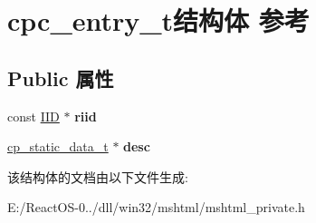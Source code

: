 \hypertarget{structcpc__entry__t}{}\section{cpc\+\_\+entry\+\_\+t结构体 参考}
\label{structcpc__entry__t}
\subsection*{Public 属性}
\begin{DoxyCompactItemize}
\item 
\mbox{\label{structcpc__entry__t_ae70b347a235b8e35c032e3fdef2b6d48}} 
const \hyperlink{struct___i_i_d}{I\+ID} $\ast$ {\bfseries riid}
\item 
\mbox{\label{structcpc__entry__t_a917beb05c50da494cd9ccd8e79f2e345}} 
\hyperlink{struct__cp__static__data__t}{cp\+\_\+static\+\_\+data\+\_\+t} $\ast$ {\bfseries desc}
\end{DoxyCompactItemize}


该结构体的文档由以下文件生成\+:\begin{DoxyCompactItemize}
\item 
E\+:/\+React\+O\+S-\/0../dll/win32/mshtml/mshtml\+\_\+private.\+h\end{DoxyCompactItemize}
